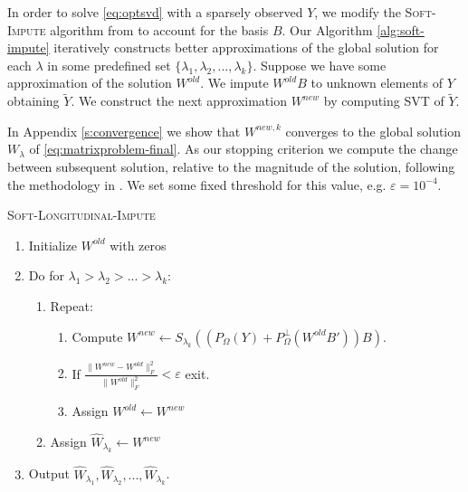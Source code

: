 \documentclass[preprint]{imsart}
\numberwithin{equation}{section}
\theoremstyle{plain}
\begin{document}
In order to solve \eqref{eq:optsvd} with a sparsely observed  $Y$, we modify the \textsc{Soft-Impute} algorithm from \citep{mazumder2010spectral} to account for the basis $B$. Our Algorithm \ref{alg:soft-impute} iteratively constructs better approximations of the global solution for each $\lambda$ in some predefined set $\{\lambda_1, \lambda_2, ..., \lambda_k\}$. Suppose we have some approximation of the solution $W^{old}$. We impute $W^{old}B$ to unknown elements of $Y$ obtaining $\tilde{Y}$. We construct the next approximation $W^{new}$ by computing SVT of $\tilde{Y}$.

In Appendix \ref{s:convergence} we show that $W^{new,k}$ converges to the global solution $W_\lambda$ of \eqref{eq:matrixproblem-final}. As our stopping criterion we compute the change between subsequent solution, relative to the magnitude of the solution, following the methodology in \cite{cai2010singular}. We set some fixed threshold for this value, e.g. $\varepsilon = 10^{-4}$.

\begin{algorithm}
\caption{\textsc{Soft-Longitudinal-Impute}\label{alg:soft-impute}}
\begin{enumerate}
\item Initialize $W^{old}$ with zeros
\item Do for $\lambda_1 > \lambda_2 > ... > \lambda_k$:
\begin{enumerate}
\item Repeat:
\begin{enumerate}
\item Compute $W^{new} \leftarrow S_{\lambda_k}( (P_\Omega(Y) + P_\Omega^\perp(W^{old}B'))B )$.
\item If $\frac{\|W^{new} - W^{old}\|_F^2}{\|W^{old}\|_F^2} < \varepsilon$ exit.
\item Assign $W^{old} \leftarrow W^{new}$
\end{enumerate}
\item Assign $\hat{W}_{\lambda_k} \leftarrow W^{new}$
\end{enumerate}
\item Output $\hat{W}_{\lambda_1}, \hat{W}_{\lambda_2}, ... , \hat{W}_{\lambda_k}$.
\end{enumerate}
\end{algorithm}
\end{document}

